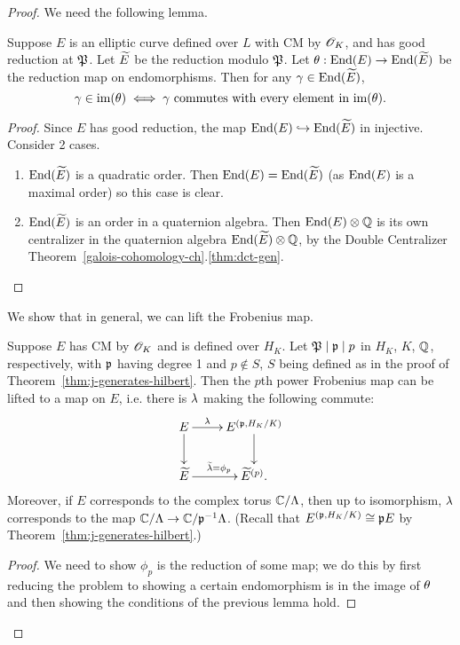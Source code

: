 \begin{proof}
We need the following lemma.
\begin{lem}
Suppose $E$ is an elliptic curve defined over $L$ with CM by $\mathscr{O}_K$, and has good reduction at $\mathfrak{P}$. Let $\widetilde{E}$ be the reduction modulo $\mathfrak{P}$. Let $\theta:\operatorname{End}(E)\to \operatorname{End}(\widetilde{E})$ be the reduction map on endomorphisms. Then for any $\gamma\in \operatorname{End}(\widetilde{E})$,
\[
\gamma\in \text{im}(\theta)\iff \gamma\text{ commutes with every element in }\text{im}(\theta).
\]
\end{lem}
\begin{proof}
Since $E$ has good reduction, the map $\operatorname{End}(E)\hookrightarrow \operatorname{End}(\widetilde{E})$ in injective. Consider 2 cases.
\begin{enumerate}
\item
$\operatorname{End}(\widetilde{E})$ is a quadratic order. Then $\operatorname{End}(E)=\operatorname{End}(\widetilde{E})$ (as $\operatorname{End}(E)$ is a maximal order) so this case is clear.
\item
$\operatorname{End}(\widetilde{E})$ is an order in a quaternion algebra. Then $\operatorname{End}(E)\otimes \mathbb{Q}$ is its own centralizer in the quaternion algebra $\operatorname{End}(\widetilde{E})\otimes \mathbb{Q}$, by the Double Centralizer Theorem~\ref{galois-cohomology-ch}.\ref{thm:dct-gen}.
\end{enumerate}
\end{proof}

 We show that in general, we can lift the Frobenius map.
\begin{pr}
Suppose $E$ has CM by $\mathscr{O}_K$ and is defined over $H_K$. Let $\mathfrak{P}\mid \mathfrak{p}\mid p$ in $H_K$, $K$, $\mathbb{Q}$, respectively, with $\mathfrak{p}$ having degree 1 and $p\nin S$, $S$ being defined as in the proof of Theorem~\ref{thm:j-generates-hilbert}. Then the $p$th power Frobenius map can be lifted to a map on $E$, i.e. there is $\lambda$ making the following commute:
\[
\xymatrix{
E\ar[r]^-{\la} \ar[d] &E^{(\mfp,H_K/K)}\ar[d]\\
\wt E\ar[r]^{\wt{\la}=\phi_p} & \wt E^{(p)}.
}
\]
Moreover, if $E$ corresponds to the complex torus $\mathbb{C}/\Lambda$, then up to isomorphism, $\lambda$ corresponds to the map $\mathbb{C}/\Lambda\to \mathbb{C}/\mathfrak{p}^{-1}\Lambda$. (Recall that $E^{(\mathfrak{p},H_K/K)}\cong \mathfrak{p} E$ by Theorem~\ref{thm:j-generates-hilbert}.)
\end{pr}
\begin{proof}
We need to show $\phi_p$ is the reduction of some map; we do this by first reducing the problem to showing a certain endomorphism is in the image of $\theta$ and then showing the conditions of the previous lemma hold.


\end{proof}
\end{proof}
